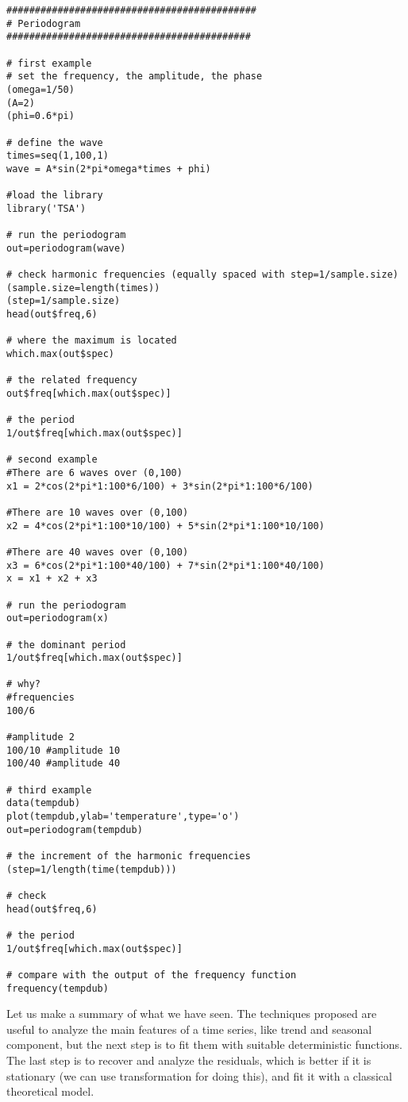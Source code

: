 \begin{example}
    \begin{verbatim}
############################################
# Periodogram
###########################################

# first example
# set the frequency, the amplitude, the phase
(omega=1/50)
(A=2)
(phi=0.6*pi)

# define the wave
times=seq(1,100,1)
wave = A*sin(2*pi*omega*times + phi)

#load the library
library('TSA')

# run the periodogram
out=periodogram(wave)

# check harmonic frequencies (equally spaced with step=1/sample.size)
(sample.size=length(times))
(step=1/sample.size)
head(out$freq,6)

# where the maximum is located
which.max(out$spec)

# the related frequency
out$freq[which.max(out$spec)]

# the period
1/out$freq[which.max(out$spec)]

# second example
#There are 6 waves over (0,100)
x1 = 2*cos(2*pi*1:100*6/100) + 3*sin(2*pi*1:100*6/100)

#There are 10 waves over (0,100)
x2 = 4*cos(2*pi*1:100*10/100) + 5*sin(2*pi*1:100*10/100)

#There are 40 waves over (0,100)
x3 = 6*cos(2*pi*1:100*40/100) + 7*sin(2*pi*1:100*40/100)
x = x1 + x2 + x3

# run the periodogram
out=periodogram(x)

# the dominant period
1/out$freq[which.max(out$spec)]

# why?
#frequencies
100/6

#amplitude 2
100/10 #amplitude 10
100/40 #amplitude 40

# third example
data(tempdub)
plot(tempdub,ylab='temperature',type='o')
out=periodogram(tempdub)

# the increment of the harmonic frequencies
(step=1/length(time(tempdub)))

# check
head(out$freq,6)

# the period
1/out$freq[which.max(out$spec)]

# compare with the output of the frequency function
frequency(tempdub)
    \end{verbatim}
\end{example}

Let us make a summary of what we have seen. The techniques proposed are useful to analyze the main features of a time series, like trend and seasonal component, but the next step is to fit them with suitable deterministic functions. The last step is to recover and analyze the residuals, which is better if it is stationary (we can use transformation for doing this), and fit it with a classical theoretical model.

